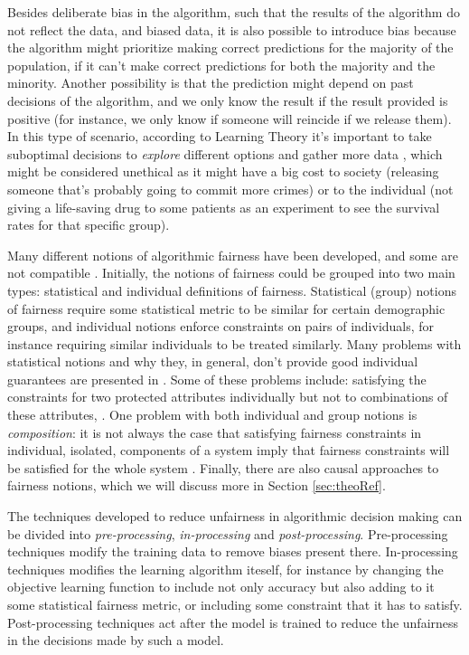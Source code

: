 Besides deliberate bias in the algorithm, such that the results of the algorithm do not reflect the data, and biased data, it is also possible to introduce bias because the algorithm might prioritize making correct predictions for the majority of the population, if it can't make correct predictions for both the majority and the minority. Another possibility is that the prediction might depend on past decisions of the algorithm, and we only know the result if the result provided is positive (for instance, we only know if someone will reincide if we release them). In this type of scenario, according to Learning Theory it's important to take suboptimal decisions to \textit{explore} different options and gather more data \cite{The Frontiers of Fairness in Machine Learning}, which might be considered unethical as it might have a big cost to society (releasing someone that's probably going to commit more crimes) or to the individual (not giving a life-saving drug to some patients as an experiment to see the survival rates for that specific group). 

Many different notions of algorithmic fairness have been developed, and some are not compatible \cite{uncompatibleFair}. Initially, the notions of fairness could be grouped into two main types: statistical and individual definitions of fairness\cite{The Frontiers of Fairness in Machine Learning}. Statistical (group) notions of fairness require some statistical metric to be similar for certain demographic groups, and individual notions enforce constraints on pairs of individuals, for instance requiring similar individuals to be treated similarly. Many problems with statistical notions and why they, in general, don't provide good individual guarantees are presented in \cite{awareness}\cite{Preventing Fairness Gerrymandering:Auditing and Learning for Subgroup Fairness}. Some of these problems include: satisfying the constraints for two protected attributes individually but not to combinations of these attributes, . One problem with both individual and group notions is \textit{composition}: it is not always the case that satisfying fairness constraints in individual, isolated, components of a system imply that fairness constraints will be satisfied for the whole system \cite{Fairness Under Composition}. Finally, there are also causal approaches to fairness notions, which we will discuss more in Section \ref{sec:theoRef}.

The techniques developed to reduce unfairness in algorithmic decision making can be divided into \textit{pre-processing}, \textit{in-processing} and \textit{post-processing}. Pre-processing techniques modify the training data to remove biases present there. In-processing techniques modifies the learning algorithm iteself, for instance by changing the objective learning function to include not only accuracy but also adding to it some statistical fairness metric, or including some constraint that it has to satisfy. Post-processing techniques act after the model is trained to reduce the unfairness in the decisions made by such a model.

